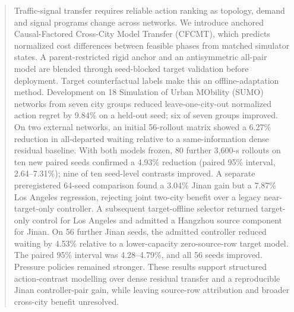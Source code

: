 \begin{abstract}
Traffic-signal transfer requires reliable action ranking as topology, demand
and signal programs change across networks.  We introduce anchored
Causal-Factored Cross-City Model Transfer (CFCMT), which predicts normalized
cost differences between feasible phases from matched simulator states.
A parent-restricted rigid anchor and an antisymmetric all-pair model are
blended through seed-blocked target validation before deployment.
Target counterfactual labels make this an offline-adaptation method.
Development on 18 Simulation of Urban MObility (SUMO) networks from seven city
groups reduced leave-one-city-out normalized action regret by 9.84\% on a held-out seed;
six of seven groups improved.  On two external networks, an initial 56-rollout
matrix showed a 6.27\% reduction in all-departed waiting relative to a
same-information dense residual baseline.  With both models frozen, 80 further
3,600-s rollouts on ten new paired seeds confirmed a 4.93\% reduction
(paired 95\% interval, 2.64--7.31\%); nine of ten seed-level contrasts improved.
A separate preregistered 64-seed
comparison found a 3.04\% Jinan gain but a 7.87\% Los Angeles regression,
rejecting joint two-city benefit over a legacy near-target-only controller.
A subsequent target-offline selector returned target-only control for Los
Angeles and admitted a Hangzhou source component for Jinan.
On 56 further Jinan seeds, the admitted controller reduced waiting by 4.53\%
relative to a lower-capacity zero-source-row target model.
The paired 95\% interval was 4.28--4.79\%, and all 56 seeds improved.
Pressure policies remained stronger.  These results support structured
action-contrast modelling over dense residual transfer and a reproducible
Jinan controller-pair gain, while leaving source-row attribution and broader
cross-city benefit unresolved.
\end{abstract}
